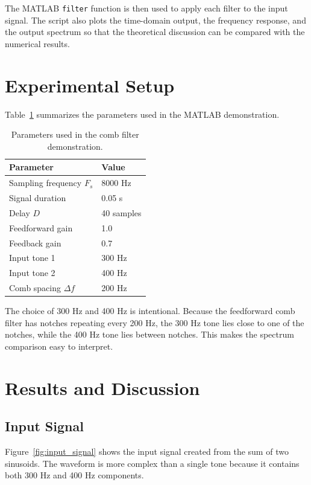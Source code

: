 \documentclass[11pt]{article}
\begin{document}
The MATLAB \texttt{filter} function is then used to apply each filter to the input signal. The script also plots the time-domain output, the frequency response, and the output spectrum so that the theoretical discussion can be compared with the numerical results.

\section{Experimental Setup}
Table~\ref{tab:parameters} summarizes the parameters used in the MATLAB demonstration.

\begin{table}[H]
    \centering
    \caption{Parameters used in the comb filter demonstration.}
    \label{tab:parameters}
    \begin{tabular}{ll}
        \toprule
        Parameter & Value \\
        \midrule
        Sampling frequency $F_s$ & 8000 Hz \\
        Signal duration & 0.05 s \\
        Delay $D$ & 40 samples \\
        Feedforward gain & 1.0 \\
        Feedback gain & 0.7 \\
        Input tone 1 & 300 Hz \\
        Input tone 2 & 400 Hz \\
        Comb spacing $\Delta f$ & 200 Hz \\
        \bottomrule
    \end{tabular}
\end{table}

The choice of 300 Hz and 400 Hz is intentional. Because the feedforward comb filter has notches repeating every 200 Hz, the 300 Hz tone lies close to one of the notches, while the 400 Hz tone lies between notches. This makes the spectrum comparison easy to interpret.

\section{Results and Discussion}
\subsection{Input Signal}
Figure~\ref{fig:input_signal} shows the input signal created from the sum of two sinusoids. The waveform is more complex than a single tone because it contains both 300 Hz and 400 Hz components.
\end{document}
